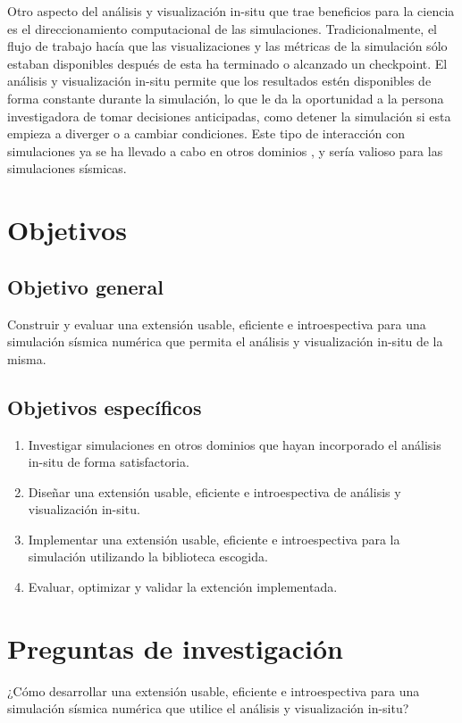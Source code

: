 \documentclass{article}
\begin{document}
Otro aspecto del análisis y visualización in-situ que trae beneficios para la ciencia es el direccionamiento computacional de las simulaciones. Tradicionalmente, el flujo de trabajo hacía que las visualizaciones y las métricas de la simulación sólo estaban disponibles después de esta ha terminado o alcanzado un checkpoint. El análisis y visualización in-situ permite que los resultados estén disponibles de forma constante durante la simulación, lo que le da la oportunidad a la persona investigadora de tomar decisiones anticipadas, como detener la simulación si esta empieza a diverger o a cambiar condiciones. Este tipo de interacción con simulaciones ya se ha llevado a cabo en otros dominios \cite{Yi2014}, y sería valioso para las simulaciones sísmicas.

\section{Objetivos}
\subsection{Objetivo general}
Construir y evaluar una extensión usable, eficiente e introespectiva para una simulación sísmica numérica que permita el análisis y visualización in-situ de la misma.
\subsection{Objetivos específicos}
\begin{enumerate}
  \item Investigar simulaciones en otros dominios que hayan incorporado el análisis in-situ de forma satisfactoria.
  \item Diseñar una extensión usable, eficiente e introespectiva de análisis y visualización in-situ.
  \item Implementar una extensión usable, eficiente e introespectiva para la simulación utilizando la biblioteca escogida.
  \item Evaluar, optimizar y validar la extención implementada.
\end{enumerate}

\section{Preguntas de investigación}
¿Cómo desarrollar una extensión usable, eficiente e introespectiva para una simulación sísmica numérica que utilice el análisis y visualización in-situ?

\printbibliography
\end{document}
